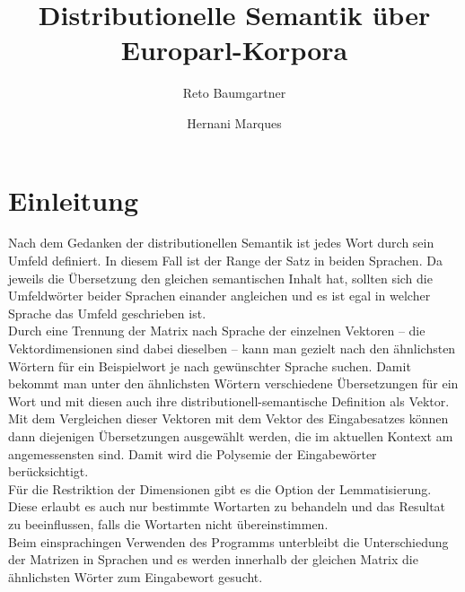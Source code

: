 \documentclass[11pt,twoside,openright]{mpreport}
\title{Distributionelle Semantik über Europarl-Korpora
}
\author{Reto Baumgartner \and Hernani Marques}
\begin{document}
\maketitle
\small
\tableofcontents
\normalsize

\chapter{Einleitung}
\label{cha:einleitung}
Nach dem Gedanken der distributionellen Semantik ist jedes Wort durch sein Umfeld definiert. In diesem Fall ist der Range der Satz in beiden Sprachen. Da jeweils die Übersetzung den gleichen semantischen Inhalt hat, sollten sich die Umfeldwörter beider Sprachen einander angleichen und es ist egal in welcher Sprache das Umfeld geschrieben ist.\\
Durch eine Trennung der Matrix nach Sprache der einzelnen Vektoren -- die Vektordimensionen sind dabei dieselben -- kann man gezielt nach den ähnlichsten Wörtern für ein Beispielwort je nach gewünschter Sprache suchen. Damit bekommt man unter den ähnlichsten Wörtern verschiedene Übersetzungen für ein Wort und mit diesen auch ihre distributionell-semantische Definition als Vektor. Mit dem Vergleichen dieser Vektoren mit dem Vektor des Eingabesatzes können dann diejenigen Übersetzungen ausgewählt werden, die im aktuellen Kontext am angemessensten sind. Damit wird die Polysemie der Eingabewörter berücksichtigt.\\
Für die Restriktion der Dimensionen gibt es die Option der Lemmatisierung. Diese erlaubt es auch nur bestimmte Wortarten zu behandeln und das Resultat zu beeinflussen, falls die Wortarten nicht übereinstimmen. \\
Beim einsprachingen Verwenden des Programms unterbleibt die Unterschiedung der Matrizen in Sprachen und es werden innerhalb der gleichen Matrix die ähnlichsten Wörter zum Eingabewort gesucht.

\end{document}
